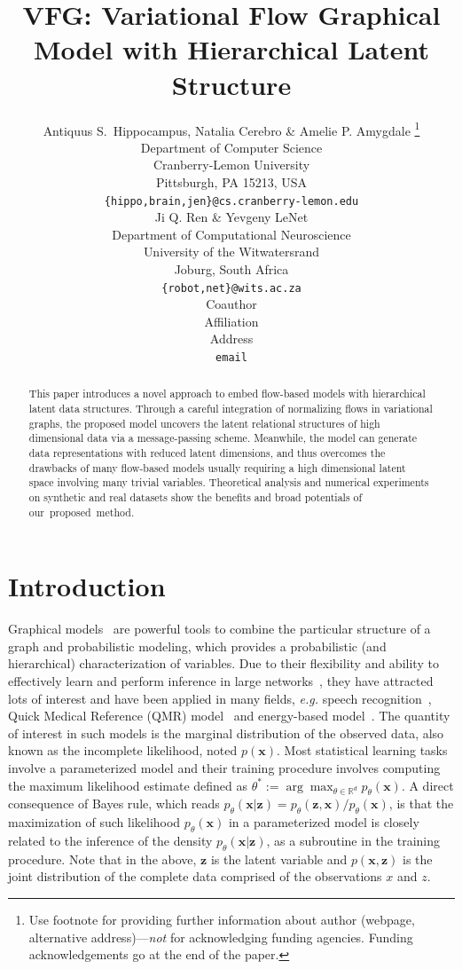 \documentclass{article} %
\title{VFG: Variational Flow Graphical Model with Hierarchical Latent Structure\\
}
\author{Antiquus S.~Hippocampus, Natalia Cerebro \& Amelie P. Amygdale \thanks{ Use footnote for providing further information
about author (webpage, alternative address)---\emph{not} for acknowledging
funding agencies.  Funding acknowledgements go at the end of the paper.} \\
Department of Computer Science\\
Cranberry-Lemon University\\
Pittsburgh, PA 15213, USA \\
\texttt{\{hippo,brain,jen\}@cs.cranberry-lemon.edu} \\
\And
Ji Q. Ren \& Yevgeny LeNet \\
Department of Computational Neuroscience \\
University of the Witwatersrand \\
Joburg, South Africa \\
\texttt{\{robot,net\}@wits.ac.za} \\
\AND
Coauthor \\
Affiliation \\
Address \\
\texttt{email}
}
\begin{document}
\maketitle

\begin{abstract}\vspace{-0.1in}
This paper introduces a novel approach to embed flow-based models with hierarchical latent data structures. Through a careful integration of normalizing flows in variational graphs, the proposed model uncovers the latent relational structures of high dimensional data via a message-passing scheme. Meanwhile, the model can generate data representations with reduced latent dimensions, and thus overcomes the drawbacks of many flow-based models usually requiring a high dimensional latent space involving many trivial variables. Theoretical analysis and numerical experiments on synthetic and real datasets show the benefits and broad potentials of our~proposed~method. 
\end{abstract}


\section{Introduction}
\vspace{-0.05in}
Graphical models~\citep{madigan1995bayesian,hruschka2007bayesian} are powerful tools to combine the particular structure of a graph and probabilistic modeling, which provides a probabilistic (and hierarchical) characterization of variables. 
Due to their flexibility and ability to effectively learn and perform inference in large networks~\citep{koller2007graphical}, they have attracted lots of interest and have been applied in many fields, \textit{e.g.} speech recognition~\citep{bilmes2005graphical}, Quick Medical Reference (QMR) model~\citep{shwe1990probabilistic} and energy-based model~\citep{jordan1999graphical}.
The quantity of interest in such models is the marginal distribution of the observed data, also known as the incomplete likelihood, noted $p(\mathbf{x})$.
Most statistical learning tasks involve a parameterized model and their training procedure involves computing the maximum likelihood estimate defined as $\theta^* :=  \arg \max_{\theta \in \mathbb{R}^d} p_{\theta}(\mathbf{x})$.
A direct consequence of Bayes rule, which reads $p_{\theta}(\mathbf{x}|\mathbf{z}) = p_{\theta}(\mathbf{z}, \mathbf{x}) / p_{\theta}(\mathbf{x})$, is that the maximization of such likelihood $p_{\theta}(\mathbf{x})$ in a parameterized model is closely related to the inference of the density $p_{\theta}(\mathbf{x}|\mathbf{z})$, as a subroutine in the training procedure.
 Note that in the above, $\mathbf{z}$ is the latent variable and $p(\mathbf{x}, \mathbf{z})$ is the joint distribution of the complete data comprised of the observations $x$ and $z$. 
\end{document}
